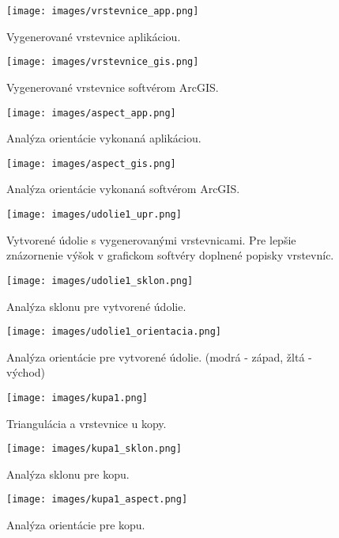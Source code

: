 \documentclass[11pt]{article}
\begin{document}
\begin{figure}[htbp]
\captionsetup{justification=centering}
\centering
\texttt{[image: images/vrstevnice\_app.png]}
\caption{Vygenerované vrstevnice aplikáciou.}
\label{fig:obr6}

\bigskip

\texttt{[image: images/vrstevnice\_gis.png]}
\caption{Vygenerované vrstevnice softvérom ArcGIS.}
\label{fig:obr7}
\end{figure}

\begin{figure}[htbp]
\captionsetup{justification=centering}
\centering
\texttt{[image: images/aspect\_app.png]}
\caption{Analýza orientácie vykonaná aplikáciou.}
\label{fig:obr8}

\bigskip

\texttt{[image: images/aspect\_gis.png]}
\caption{Analýza orientácie vykonaná softvérom ArcGIS.}
\label{fig:obr9}
\end{figure}


\begin{figure}[htbp]
\captionsetup{justification=centering}
\centering
\texttt{[image: images/udolie1\_upr.png]}
\caption{Vytvorené údolie s vygenerovanými vrstevnicami. Pre lepšie znázornenie výšok v grafickom softvéry doplnené popisky vrstevníc.}
\label{fig:obr10}

\bigskip

\texttt{[image: images/udolie1\_sklon.png]}
\caption{Analýza sklonu pre vytvorené údolie.}
\label{fig:obr11}
\end{figure}

\begin{figure}[htbp]
\captionsetup{justification=centering}
\centering
\texttt{[image: images/udolie1\_orientacia.png]}
\caption{Analýza orientácie pre vytvorené údolie. (modrá - západ, žltá - východ)}
\label{fig:obr12}

\bigskip

\texttt{[image: images/kupa1.png]}
\caption{Triangulácia a vrstevnice u kopy.}
\label{fig:obr13}
\end{figure}

\begin{figure}[htbp]
\captionsetup{justification=centering}
\centering
\texttt{[image: images/kupa1\_sklon.png]}
\caption{Analýza sklonu pre kopu.}
\label{fig:obr14}

\bigskip

\texttt{[image: images/kupa1\_aspect.png]}
\caption{Analýza orientácie pre kopu.}
\label{fig:obr15}
\end{figure}
\end{document}
